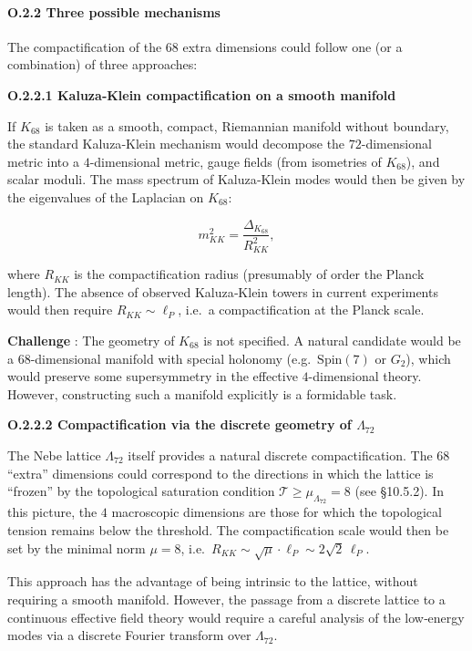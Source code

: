 \documentclass[11pt]{article}
\let\oldmathcal\mathcal
\renewcommand{\mathcal}[1]{\oldmathcal{#1}}
\begin{document}
\hypertarget{o.2.2-three-possible-mechanisms}{%
\paragraph{O.2.2 Three possible
mechanisms}\label{o.2.2-three-possible-mechanisms}}

The compactification of the \(68\) extra dimensions could follow one (or
a combination) of three approaches:

\textbf{O.2.2.1 Kaluza‑Klein compactification on a smooth manifold}

If \(K_{68}\) is taken as a smooth, compact, Riemannian manifold without
boundary, the standard Kaluza‑Klein mechanism would decompose the
\(72\)-dimensional metric into a \(4\)-dimensional metric, gauge fields
(from isometries of \(K_{68}\)), and scalar moduli. The mass spectrum of
Kaluza‑Klein modes would then be given by the eigenvalues of the
Laplacian on \(K_{68}\):

\[
m_{KK}^2 = \frac{\Delta_{K_{68}}}{R_{KK}^2},
\]

where \(R_{KK}\) is the compactification radius (presumably of order the
Planck length). The absence of observed Kaluza‑Klein towers in current
experiments would then require \(R_{KK} \sim \ell_P\), i.e.~a
compactification at the Planck scale.

\textbf{Challenge} : The geometry of \(K_{68}\) is not specified. A
natural candidate would be a \(68\)-dimensional manifold with special
holonomy (e.g.~\(\mathrm{Spin}(7)\) or \(G_2\)), which would preserve
some supersymmetry in the effective \(4\)-dimensional theory. However,
constructing such a manifold explicitly is a formidable task.

\textbf{O.2.2.2 Compactification via the discrete geometry of
\(\Lambda_{72}\)}

The Nebe lattice \(\Lambda_{72}\) itself provides a natural discrete
compactification. The \(68\) ``extra'' dimensions could correspond to
the directions in which the lattice is ``frozen'' by the topological
saturation condition \(\mathcal{T} \ge \mu_{\Lambda_{72}} = 8\) (see
§10.5.2). In this picture, the \(4\) macroscopic dimensions are those
for which the topological tension remains below the threshold. The
compactification scale would then be set by the minimal norm
\(\mu = 8\),
i.e.~\(R_{KK} \sim \sqrt{\mu} \cdot \ell_P \sim 2\sqrt{2}\,\ell_P\).

This approach has the advantage of being intrinsic to the lattice,
without requiring a smooth manifold. However, the passage from a
discrete lattice to a continuous effective field theory would require a
careful analysis of the low‑energy modes via a discrete Fourier
transform over \(\Lambda_{72}\).
\end{document}
